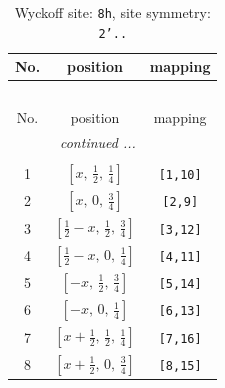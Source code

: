 \documentclass[fleqn,8pt]{jsarticle}
\begin{document}
\begin{longtable}{ccc}
\caption{Wyckoff site: {\tt 8h}, site symmetry: {\tt 2'..}}
 \\
 \hline \hline
No. & position & mapping \\ \hline \endfirsthead

\multicolumn{2}{l}{\tablename\ \thetable{}} \\
 \hline \hline
No. & position & mapping \\ \hline \endhead

 \hline \hline
\multicolumn{2}{r}{\footnotesize\it continued ...} \\ \endfoot

 \hline \hline
\multicolumn{2}{r}{} \\ \endlastfoot

1 & $\left[ x,\, \frac{1}{2},\, \frac{1}{4} \right]$ & {\tt [1,10]} \\ \hline
2 & $\left[ x,\, 0,\, \frac{3}{4} \right]$ & {\tt [2,9]} \\ \hline
3 & $\left[ \frac{1}{2} - x,\, \frac{1}{2},\, \frac{3}{4} \right]$ & {\tt [3,12]} \\ \hline
4 & $\left[ \frac{1}{2} - x,\, 0,\, \frac{1}{4} \right]$ & {\tt [4,11]} \\ \hline
5 & $\left[ - x,\, \frac{1}{2},\, \frac{3}{4} \right]$ & {\tt [5,14]} \\ \hline
6 & $\left[ - x,\, 0,\, \frac{1}{4} \right]$ & {\tt [6,13]} \\ \hline
7 & $\left[ x + \frac{1}{2},\, \frac{1}{2},\, \frac{1}{4} \right]$ & {\tt [7,16]} \\ \hline
8 & $\left[ x + \frac{1}{2},\, 0,\, \frac{3}{4} \right]$ & {\tt [8,15]} \\
\end{longtable}
\renewcommand{\arraystretch}{1.2}
\end{document}
